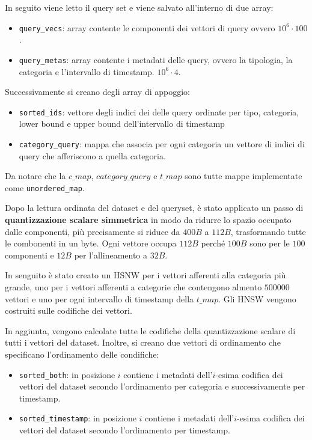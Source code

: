 In seguito viene letto il query set e viene salvato all'interno di due array:
\begin{itemize}
    \item \texttt{query\_vecs}: array contente le componenti dei vettori di query ovvero 
    $10^6 \cdot 100$.
    \item \texttt{query\_metas}: array contente i metadati delle query, ovvero la tipologia,
    la categoria e l'intervallo di timestamp.
    $10^6 \cdot 4$.
\end{itemize}

Successivamente si creano degli array di appoggio:
\begin{itemize}
    \item \texttt{sorted\_ids}: vettore degli indici dei delle query ordinate per tipo, 
    categoria, lower bound e upper bound dell'intervallo di timestamp
    \item \texttt{category\_query}: mappa che associa per ogni categoria un vettore di 
    indici di query che afferiscono a quella categoria.
\end{itemize}

Da notare che la $c\_map$, $category\_query$ e $t\_map$ sono tutte mappe implementate 
come \texttt{unordered\_map}.

Dopo la lettura ordinata del dataset e del queryset, è stato applicato un passo di 
\textbf{quantizzazione scalare simmetrica} in modo da ridurre lo spazio occupato dalle componenti, 
più precisamente si riduce da $400B$ a $112B$, trasformando tutte le combonenti in 
un byte. Ogni vettore occupa $112B$ perché $100B$ sono per le $100$ componenti e $12B$
per l'allineamento a $32B$.

In senguito è stato creato un HSNW per i vettori 
afferenti alla categoria più grande, uno per i vettori afferenti a categorie che 
contengono almento $500000$ vettori e uno per ogni intervallo di timestamp della 
$t\_map$. Gli HNSW vengono costruiti sulle codifiche dei vettori.

In aggiunta, vengono calcolate tutte le codifiche della quantizzazione scalare 
di tutti i vettori del dataset. Inoltre, si creano due vettori di ordinamento 
che specificano l'ordinamento delle condifiche:
\begin{itemize}
    \item \texttt{sorted\_both}: in posizione $i$ contiene i metadati dell'$i$-esima
    codifica dei vettori del dataset secondo l'ordinamento per categoria e successivamente
    per timestamp.
    \item \texttt{sorted\_timestamp}: in posizione $i$ contiene i metadati dell'$i$-esima
    codifica dei vettori del dataset secondo l'ordinamento per timestamp.
\end{itemize}

